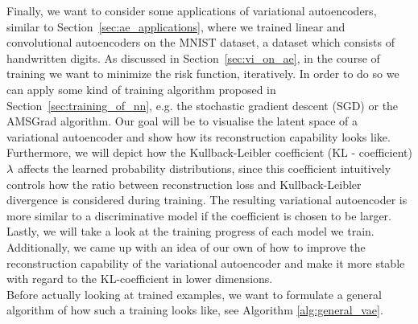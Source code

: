 Finally, we want to consider some applications of variational autoencoders, similar to Section~\ref{sec:ae_applications}, where we trained linear and convolutional autoencoders on the MNIST dataset, a dataset which consists of handwritten digits. As discussed in Section~\ref{sec:vi_on_ae}, in the course of training we want to minimize the risk function, iteratively. In order to do so we can apply some kind of training algorithm proposed in Section~\ref{sec:training_of_nn}, e.g. the stochastic gradient descent (SGD) or the AMSGrad algorithm. Our goal will be to visualise the latent space of a variational autoencoder and show how its reconstruction capability looks like. Furthermore, we will depict how the Kullback-Leibler coefficient (KL - coefficient) $\lambda$ affects the learned probability distributions, since this coefficient intuitively controls how the ratio between reconstruction loss and Kullback-Leibler divergence is considered during training. The resulting variational autoencoder is \glqq more similar\grqq{} to a discriminative model if the coefficient is chosen to be larger. Lastly, we will take a look at the training progress of each model we train. Additionally, we came up with an idea of our own of how to improve the reconstruction capability of the variational autoencoder and make it more stable with regard to the KL-coefficient  in lower dimensions.\\
Before actually looking at trained examples, we want to formulate a general algorithm of how such a training looks like, see Algorithm \ref{alg:general_vae}.


